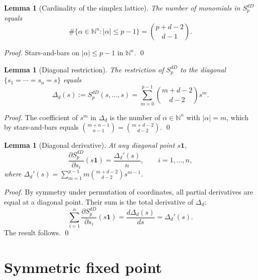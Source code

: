 \documentclass[11pt,a4paper]{article}
\newtheorem{lemma}[theorem]{Lemma}
\theoremstyle{definition}
\theoremstyle{remark}
\newcommand{\N}{\mathbb{N}}
\newcommand{\one}{\mathbf{1}}
\begin{document}
\begin{lemma}[Cardinality of the simplex lattice]
\label{lem:cardinality}
The number of monomials in $S_p^{dD}$ equals
\[
  \#\{\alpha \in \N^n : |\alpha| \leq p-1\} = \binom{p + d - 2}{d - 1}.
\]
\end{lemma}

\begin{proof}
Stars-and-bars on $|\alpha| \leq p-1$ in $\N^{n}$. \qed
\end{proof}

\begin{lemma}[Diagonal restriction]
\label{lem:diagonal}
The restriction of $S_p^{dD}$ to the diagonal
$\{s_1 = \cdots = s_n = s\}$ equals
\begin{equation}
  \label{eq:Delta_d}
  \Delta_d(s) := S_p^{dD}(s, \ldots, s) = \sum_{m=0}^{p-1} \binom{m + d - 2}{d - 2} s^m.
\end{equation}
\end{lemma}

\begin{proof}
The coefficient of $s^m$ in $\Delta_d$ is the number of $\alpha \in \N^n$
with $|\alpha| = m$, which by stars-and-bars equals
$\binom{m + n - 1}{n - 1} = \binom{m + d - 2}{d - 2}$. \qed
\end{proof}

\begin{lemma}[Diagonal derivative]
\label{lem:diag_derivative}
At any diagonal point $s\one$,
\begin{equation}
  \frac{\partial S_p^{dD}}{\partial s_i}(s\one) = \frac{\Delta_d'(s)}{n}, \qquad i = 1, \ldots, n,
\end{equation}
where $\Delta_d'(s) = \sum_{m=1}^{p-1} m \binom{m+d-2}{d-2} s^{m-1}$.
\end{lemma}

\begin{proof}
By symmetry under permutation of coordinates, all partial derivatives
are equal at a diagonal point.  Their sum is the total derivative of
$\Delta_d$:
\[
  \sum_{i=1}^{n} \frac{\partial S_p^{dD}}{\partial s_i}(s\one)
  = \frac{d \Delta_d(s)}{d s} = \Delta_d'(s).
\]
The result follows. \qed
\end{proof}

\section{Symmetric fixed point}
\label{sec:fixed}
\end{document}
